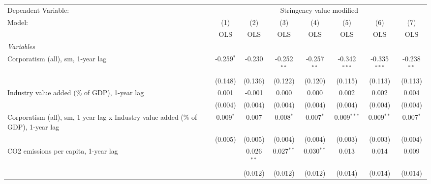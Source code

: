 
\begingroup
\centering
\begin{tabular}{lccccccc}
   \toprule
   Dependent Variable: & \multicolumn{7}{c}{Stringency value modified}\\
   Model:                                                                            & (1)          & (2)          & (3)           & (4)           & (5)            & (6)            & (7)\\  
                                                                                     &  OLS         & OLS          & OLS           & OLS           & OLS            & OLS            & OLS\\  
   \midrule
   \emph{Variables}\\
   Corporatism (all), sm, 1-year lag                                                 & -0.259$^{*}$ & -0.230       & -0.252$^{**}$ & -0.257$^{**}$ & -0.342$^{***}$ & -0.335$^{***}$ & -0.238$^{**}$\\   
                                                                                     & (0.148)      & (0.136)      & (0.122)       & (0.120)       & (0.115)        & (0.113)        & (0.113)\\   
   Industry value added (\% of GDP), 1-year lag                                      & 0.001        & -0.001       & 0.000         & 0.000         & 0.002          & 0.002          & 0.004\\   
                                                                                     & (0.004)      & (0.004)      & (0.004)       & (0.004)       & (0.004)        & (0.004)        & (0.004)\\   
   Corporatism (all), sm, 1-year lag x Industry value added (\% of GDP), 1-year lag  & 0.009$^{*}$  & 0.007        & 0.008$^{*}$   & 0.007$^{*}$   & 0.009$^{***}$  & 0.009$^{**}$   & 0.007$^{*}$\\   
                                                                                     & (0.005)      & (0.005)      & (0.004)       & (0.004)       & (0.003)        & (0.003)        & (0.004)\\   
   CO2 emissions per capita, 1-year lag                                              &              & 0.026$^{**}$ & 0.027$^{**}$  & 0.030$^{**}$  & 0.013          & 0.014          & 0.009\\   
                                                                                     &              & (0.012)      & (0.012)       & (0.012)       & (0.014)        & (0.014)        & (0.014)\\   

\end{tabular}
